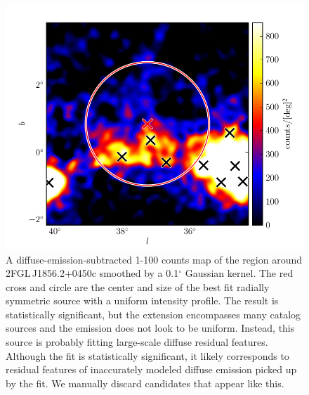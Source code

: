 \documentclass[12pt,preprint]{aastex}
\newcommand{\gev}{\text{GeV}\xspace}
\renewcommand{\deg}{\ensuremath{^\circ}\xspace}
\begin{document}
\clearpage
\begin{figure}
  \begin{center}
    \includegraphics{source_plots/example_bad_fit.pdf}
    \caption{
    A diffuse-emission-subtracted 1-100 \gev counts map of the region
    around 2FGL\,J1856.2+0450c smoothed by a 0.1\deg Gaussian kernel. The
    red cross and circle are the center and size of the best fit radially
    symmetric source with a uniform intensity profile. The result is
    statistically significant, but the extension encompasses many catalog
    sources and the emission does not look to be uniform. Instead,
    this source is probably fitting large-scale diffuse residual
    features. Although the fit is statistically significant, it likely
    corresponds to residual features of inaccurately modeled diffuse
    emission picked up by the fit.  We manually discard candidates that
    appear like this.
    }
    \label{example_bad_fit}
  \end{center}
\end{figure}
\end{document}

